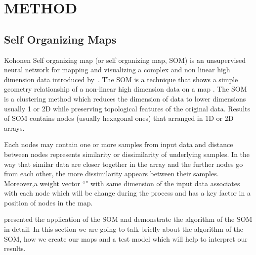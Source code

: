 
\section{METHOD}
\label{sec: method}
 \subsection{Self Organizing Maps}
 \label{sec: som}
 
 Kohonen Self organizing map (or self organizing map, SOM) is an unsupervised neural network for mapping and visualizing a complex and non linear high dimension data introduced by~\citep{Kohonen82}. 
 The SOM is a technique that shows a simple geometry relationship of a non-linear high dimension data on a map \citep{Kohonen98}.
 The SOM is a clustering method which reduces the dimension of data to lower dimensions usually 1 or 2D while preserving topological features of the original data.
 Results of SOM contains nodes (usually hexagonal ones) that arranged in 1D or 2D arrays.
 
  
 Each nodes may contain one or more samples from input data and distance between nodes represents similarity or dissimilarity of underlying samples. 
 In the way that similar data are closer together in the array and the further nodes go from each other, the more dissimilarity appears between their samples.
 Moreover,a weight vector ``" with same dimension of the input data associates with each node which will be change during the process and has a key factor in a position of nodes in the map. 
 
 \cite{Geach12} presented the application of the SOM and demonstrate the algorithm of the SOM in detail. In this section we are going to talk briefly about the algorithm of the SOM, how we create our maps and a test model which will help to interpret our results. %
 
